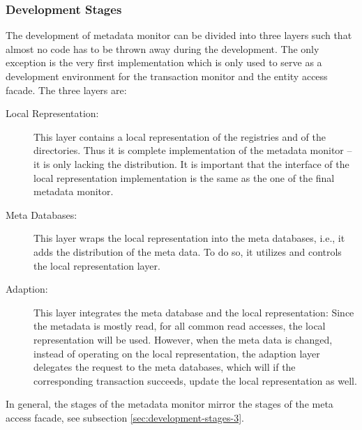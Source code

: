 \documentclass[a4paper, 10pt]{book}
\begin{document}
                                \subsubsection{Development Stages}
                                \label{sec:development-stages-2}

                                The development of metadata monitor can be divided into three layers
                                such that almost no code has to be thrown away during the development.
                                The only exception is the very first implementation which is only used
                                to serve as a development environment for the transaction monitor and
                                the entity access facade. The three layers are:
                                \begin{description}
                                    \item[Local Representation:] This layer contains a local
                                        representation of the registries and of the directories. Thus it is
                                        complete implementation of the metadata monitor -- it is only
                                        lacking the distribution. It is important that the interface of the
                                        local representation implementation is the same as the one of the
                                        final metadata monitor. 
                                    \item[Meta Databases:] This layer wraps the local representation into
                                        the meta databases, i.e., it adds the distribution of the meta data.
                                        To do so, it utilizes and controls the local representation layer.
                                    \item[Adaption:] This layer integrates the meta database and the local
                                        representation: Since the metadata is mostly read, for all common
                                        read accesses, the local representation will be used. However, when
                                        the meta data is changed, instead of operating on the local
                                        representation, the adaption layer delegates the request to the meta
                                        databases, which will if the corresponding transaction succeeds,
                                        update the local representation as well. 
                                \end{description}
                                In general, the stages of the metadata monitor mirror the stages of
                                the meta access facade, see subsection \vref{sec:development-stages-3}.
\end{document}
